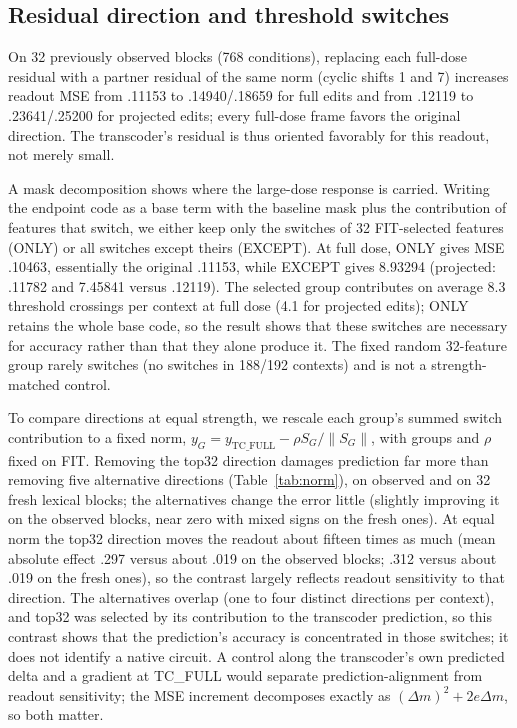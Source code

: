 \documentclass[11pt]{article}
\begin{document}
\subsection{Residual direction and threshold switches}
On 32 previously observed blocks (768 conditions), replacing each full-dose residual with a partner residual of the same norm (cyclic shifts 1 and 7) increases readout MSE from .11153 to .14940/.18659 for full edits and from .12119 to .23641/.25200 for projected edits; every full-dose frame favors the original direction. The transcoder's residual is thus oriented favorably for this readout, not merely small.

A mask decomposition shows where the large-dose response is carried. Writing the endpoint code as a base term with the baseline mask plus the contribution of features that switch, we either keep only the switches of 32 FIT-selected features (ONLY) or all switches except theirs (EXCEPT). At full dose, ONLY gives MSE .10463, essentially the original .11153, while EXCEPT gives 8.93294 (projected: .11782 and 7.45841 versus .12119). The selected group contributes on average 8.3 threshold crossings per context at full dose (4.1 for projected edits); ONLY retains the whole base code, so the result shows that these switches are necessary for accuracy rather than that they alone produce it. The fixed random 32-feature group rarely switches (no switches in 188/192 contexts) and is not a strength-matched control.

To compare directions at equal strength, we rescale each group's summed switch contribution to a fixed norm, $y_G=y_{\mathrm{TC\_FULL}}-\rho S_G/\|S_G\|$, with groups and $\rho$ fixed on FIT. Removing the top32 direction damages prediction far more than removing five alternative directions (Table~\ref{tab:norm}), on observed and on 32 fresh lexical blocks; the alternatives change the error little (slightly improving it on the observed blocks, near zero with mixed signs on the fresh ones). At equal norm the top32 direction moves the readout about fifteen times as much (mean absolute effect .297 versus about .019 on the observed blocks; .312 versus about .019 on the fresh ones), so the contrast largely reflects readout sensitivity to that direction. The alternatives overlap (one to four distinct directions per context), and top32 was selected by its contribution to the transcoder prediction, so this contrast shows that the prediction's accuracy is concentrated in those switches; it does not identify a native circuit. A control along the transcoder's own predicted delta and a gradient at TC\_FULL would separate prediction-alignment from readout sensitivity; the MSE increment decomposes exactly as $(\Delta m)^2+2e\Delta m$, so both matter.
\end{document}
